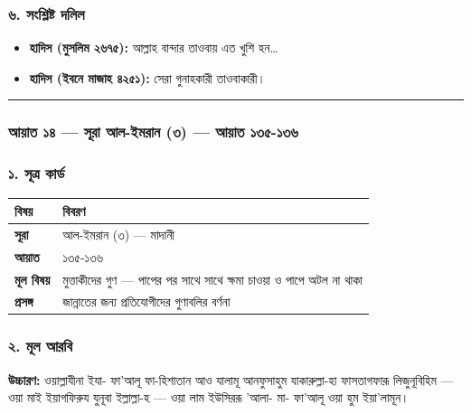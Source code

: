 \subsubsection*{৬. সংশ্লিষ্ট দলিল}

\begin{itemize}
\item \textbf{হাদিস (মুসলিম ২৬৭৫):} আল্লাহ বান্দার তাওবায় এত খুশি হন…
\item \textbf{হাদিস (ইবনে মাজাহ ৪২৫১):} সেরা গুনাহকারী তাওবাকারী।
\end{itemize}
\medskip\hrule\medskip

\subsubsection*{আয়াত ১৪ — সূরা আল-ইমরান (৩) — আয়াত ১৩৫-১৩৬}

\subsubsection*{১. সূত্র কার্ড}

\begin{table}[h]\centering\small
\begin{tabular}{ll}
বিষয় & বিবরণ \\
\hline
\textbf{সূরা} & আল-ইমরান (৩) — মাদানী \\
\textbf{আয়াত} & ১৩৫-১৩৬ \\
\textbf{মূল বিষয়} & মুত্তাকীদের গুণ — পাপের পর সাথে সাথে ক্ষমা চাওয়া ও পাপে অটল না থাকা \\
\textbf{প্রসঙ্গ} & জান্নাতের জন্য প্রতিযোগীদের গুণাবলির বর্ণনা \\
\hline
\end{tabular}
\end{table}

\subsubsection*{২. মূল আরবি}

\begin{center}\end{center}
\textbf{উচ্চারণ:} ওয়াল্লাযীনা ইযা- ফা'আলূ ফা-হিশাতান আও যালামূ আনফুসাহুম যাকারুল্লা-হা ফাসতাগফারূ লিজুনূবিহিম — ওয়া মাই ইয়াগফিরুয যুনূবা ইল্লাল্লা-হ — ওয়া লাম ইউসিররূ 'আলা- মা- ফা'আলূ ওয়া হুম ইয়া'লামূন।

